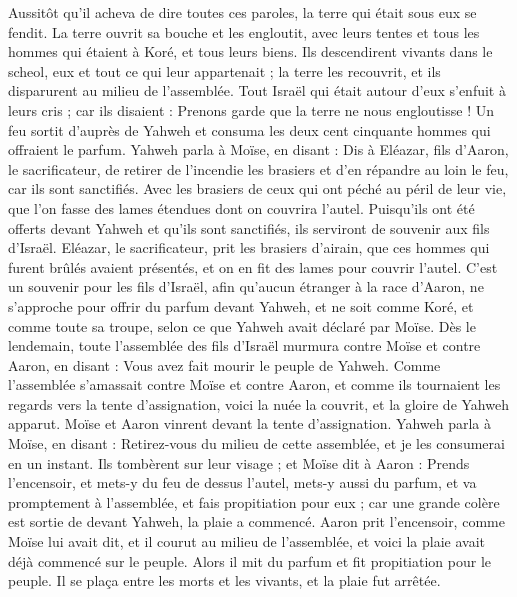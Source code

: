 \begin{multicols}{2}
Aussitôt qu'il acheva de dire toutes ces paroles, la terre qui était sous eux se fendit.
La terre ouvrit sa bouche et les engloutit, avec leurs tentes et tous les hommes qui étaient à Koré, et tous leurs biens.
Ils descendirent vivants dans le scheol, eux et tout ce qui leur appartenait ; la terre les recouvrit, et ils disparurent au milieu de l'assemblée.
Tout Israël qui était autour d'eux s'enfuit à leurs cris ; car ils disaient : Prenons garde que la terre ne nous engloutisse !
Un feu sortit d'auprès de Yahweh et consuma les deux cent cinquante hommes qui offraient le parfum.
Yahweh parla à Moïse, en disant :
Dis à Eléazar, fils d'Aaron, le sacrificateur, de retirer de l'incendie les brasiers et d'en répandre au loin le feu, car ils sont sanctifiés.
Avec les brasiers de ceux qui ont péché au péril de leur vie, que l'on fasse des lames étendues dont on couvrira l'autel. Puisqu'ils ont été offerts devant Yahweh et qu'ils sont sanctifiés, ils serviront de souvenir aux fils d'Israël.
Eléazar, le sacrificateur, prit les brasiers d'airain, que ces hommes qui furent brûlés avaient présentés, et on en fit des lames pour couvrir l'autel.
C'est un souvenir pour les fils d'Israël, afin qu'aucun étranger à la race d'Aaron, ne s'approche pour offrir du parfum devant Yahweh, et ne soit comme Koré, et comme toute sa troupe, selon ce que Yahweh avait déclaré par Moïse.
Dès le lendemain, toute l'assemblée des fils d'Israël murmura contre Moïse et contre Aaron, en disant : Vous avez fait mourir le peuple de Yahweh.
Comme l'assemblée s'amassait contre Moïse et contre Aaron, et comme ils tournaient les regards vers la tente d'assignation, voici la nuée la couvrit, et la gloire de Yahweh apparut.
Moïse et Aaron vinrent devant la tente d'assignation.
Yahweh parla à Moïse, en disant :
Retirez-vous du milieu de cette assemblée, et je les consumerai en un instant. Ils tombèrent sur leur visage ;
et Moïse dit à Aaron : Prends l'encensoir, et mets-y du feu de dessus l'autel, mets-y aussi du parfum, et va promptement à l'assemblée, et fais propitiation pour eux ; car une grande colère est sortie de devant Yahweh, la plaie a commencé.
Aaron prit l'encensoir, comme Moïse lui avait dit, et il courut au milieu de l'assemblée, et voici la plaie avait déjà commencé sur le peuple. Alors il mit du parfum et fit propitiation pour le peuple.
Il se plaça entre les morts et les vivants, et la plaie fut arrêtée.

\end{multicols}
